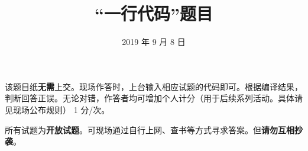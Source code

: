 \documentclass{ctexart}
\title{“一行代码”题目}
\date{2019 年 9 月 8 日}
\begin{document}
\maketitle
该题目纸\textbf{无需}上交。现场作答时，上台输入相应试题的代码即可。根据编译结果，判断回答正误。无论对错，作答者均可增加个人计分（用于后续系列活动。具体请见现场公布规则） 1 分/次。

所有试题为\textbf{开放试题}。可现场通过自行上网、查书等方式寻求答案。但\textbf{请勿互相抄袭}。


\end{document}
